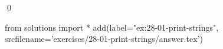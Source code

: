 
\begin{ex}
  \label{ex:28-01-print-strings}
  
  \qed
\end{ex}
\begin{python0}
from solutions import *
add(label="ex:28-01-print-strings",
    srcfilename='exercises/28-01-print-strings/answer.tex')
\end{python0}
